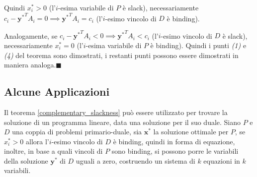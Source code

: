 \documentclass[10pt, letterpaper]{report}
\newcommand{\x}{{\mathbf{x}}}
\newcommand{\y}{{\mathbf{y}}}
\begin{document}
Quindi $x_i^*>0$ (l'$i$-esima variabile di $P$ è slack), necessariamente $c_i-{\y^*}^TA_i=0\implies {\y^*}^TA_i=c_i$ (l'$i$-esimo vincolo di $D$ è binding). 

Analogamente, se $c_i-{\y^*}^TA_i<0\implies {\y^*}^TA_i<c_i$ (l'$i$-esimo vincolo di $D$ è slack), necessariamente $x_i^*=0$ (l'$i$-esima variabile di $P$ è binding). Quindi i punti \textit{(1)} e \textit{(4)} del teorema sono dimostrati, i restanti punti possono essere dimostrati in maniera analoga.\hfill$\blacksquare$
\subsection{Alcune Applicazioni}
Il teorema \ref{complementary_slackness} può essere utilizzato per trovare la soluzione di un programma lineare, data una soluzione per il suo duale.
Siano $P$ e $D$ una coppia di problemi primario-duale, sia $\x^*$ la soluzione ottimale per $P$, se $x_i^*>0$ allora l'$i$-esimo vincolo di $D$ è binding, quindi in forma di equazione, inoltre, in base a quali vincoli di $P$ sono binding, si possono porre le variabili della soluzione $\y^*$ di $D$ uguali a zero, costruendo un sistema di $k$ equazioni in $k$ variabili.\bigskip 
\end{document}
